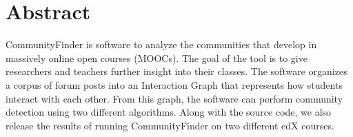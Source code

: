 \documentclass[]{article}
\begin{document}


\tableofcontents
\newpage
\listoffigures
\newpage
\listoftables
\newpage
\listofappendices
\newpage

\pagestyle{plain}
\lfoot{\today}
\cfoot{\thepage}
\pagestyle{plain}
\setcounter{page}{1}
\newpage
\section*{Abstract}

CommunityFinder is software to analyze the communities that develop in massively online open courses (MOOCs).  The goal of the tool is to give researchers and teachers further insight into their classes. The software organizes a corpus of forum posts into an Interaction Graph that represents how students interact with each other. From this graph, the software can perform community detection using two different algorithms. Along with the source code, we also release the results of running CommunityFinder on two different edX courses.






























%

\newpage

\end{document}
